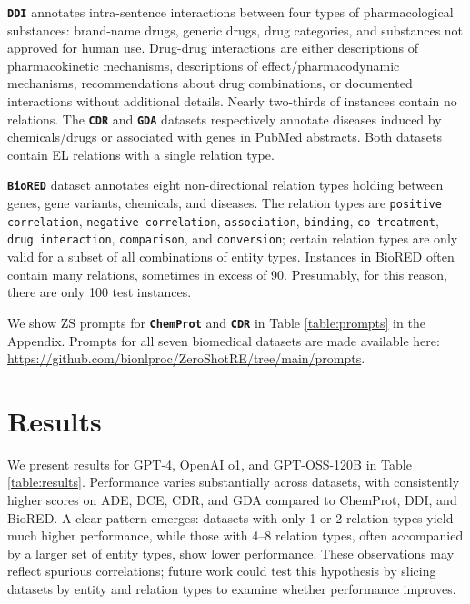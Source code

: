 \documentclass[11pt]{article}
\begin{document}
 

\textbf{\texttt{DDI}} \cite{herrero2013ddi} annotates intra-sentence interactions between four types of pharmacological substances: brand-name drugs, generic drugs, drug categories, and substances not approved for human use. Drug-drug interactions are either descriptions of pharmacokinetic mechanisms, descriptions of effect/pharmacodynamic mechanisms, recommendations about drug combinations, or documented interactions without additional details.  Nearly two-thirds of instances contain no relations.
The \textbf{\texttt{CDR}} \cite{li2016biocreative} and \textbf{\texttt{GDA}} \cite{wu2019renet} datasets respectively annotate diseases induced by chemicals/drugs or associated with genes in PubMed abstracts.  Both datasets contain EL relations with a single relation type.

\textbf{\texttt{BioRED}} \cite{luo2022biored} dataset annotates eight non-directional relation types holding between genes, gene variants, chemicals, and diseases. The relation types are \texttt{positive correlation}, \texttt{negative correlation}, \texttt{association}, \texttt{binding}, \texttt{co-treatment}, \texttt{drug interaction}, \texttt{comparison}, and \texttt{conversion}; certain relation types are only valid for a subset of all combinations of entity types. Instances in BioRED often contain many relations, sometimes in excess of 90.  Presumably, for this reason, there are only 100 test instances.

We show ZS prompts for \textbf{\texttt{ChemProt}} and \textbf{\texttt{CDR}} in Table \ref{table:prompts} in the Appendix.  Prompts for all seven biomedical datasets are made available here:  \url{https://github.com/bionlproc/ZeroShotRE/tree/main/prompts}.


\section{Results}

We present results for GPT-4, OpenAI o1, and GPT-OSS-120B in Table \ref{table:results}. Performance varies substantially across datasets, with consistently higher scores on ADE, DCE, CDR, and GDA compared to ChemProt, DDI, and BioRED. A clear pattern emerges: datasets with only 1 or 2 relation types yield much higher performance, while those with 4--8 relation types, often accompanied by a larger set of entity types, show lower performance. These observations may reflect spurious correlations; future work could test this hypothesis by slicing datasets by entity and relation types to examine whether performance improves.
\end{document}
